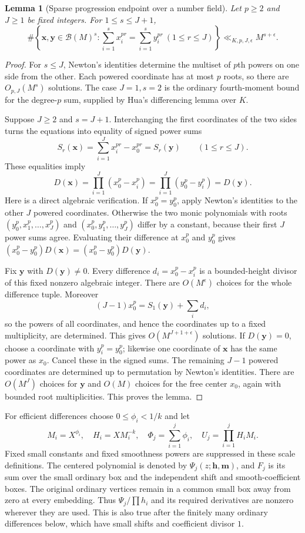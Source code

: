 \documentclass[11pt,reqno]{amsart}
\numberwithin{equation}{section}
\newtheorem{lemma}[theorem]{Lemma}
\theoremstyle{definition}
\begin{document}
\begin{lemma}[Sparse progression endpoint over a number field]
\label{lem:field-sparse-endpoint}
Let $p\ge2$ and $J\ge1$ be fixed integers. For $1\le s\le J+1$,
\[
 \#\left\{\mathbf x,\mathbf y\in\mathcal B(M)^s:
       \sum_{i=1}^s x_i^{pr}=\sum_{i=1}^s y_i^{pr}\ (1\le r\le J)\right\}
 \ll_{K,p,J,\epsilon} M^{s+\epsilon}.
\]
\end{lemma}
\begin{proof}
For $s\le J$, Newton's identities determine the multiset of $p$th powers
on one side from the other. Each powered coordinate has at most $p$ roots,
so there are $O_{p,J}(M^s)$ solutions. The case $J=1,s=2$ is the ordinary
fourth-moment bound for the degree-$p$ sum, supplied by Hua's differencing
lemma over $K$.

Suppose $J\ge2$ and $s=J+1$. Interchanging the first coordinates of the two
sides turns the equations into equality of signed power sums
\[
 S_r(\mathbf x)=\sum_{i=1}^J x_i^{pr}-x_0^{pr}
             =S_r(\mathbf y)\qquad(1\le r\le J).
\]
These equalities imply
\[
 D(\mathbf x)=\prod_{i=1}^J(x_0^p-x_i^p)
             =\prod_{i=1}^J(y_0^p-y_i^p)=D(\mathbf y).
\]
Here is a direct algebraic verification. If $x_0^p=y_0^p$, apply Newton's
identities to the other $J$ powered coordinates. Otherwise the two monic
polynomials with roots $(y_0^p,x_1^p,\ldots,x_J^p)$ and
$(x_0^p,y_1^p,\ldots,y_J^p)$ differ by a constant, because their first $J$
power sums agree. Evaluating their difference at $x_0^p$ and $y_0^p$ gives
$(x_0^p-y_0^p)D(\mathbf x)=(x_0^p-y_0^p)D(\mathbf y)$.

Fix $\mathbf y$ with $D(\mathbf y)\ne0$. Every difference
$d_i=x_0^p-x_i^p$ is a bounded-height divisor of this fixed nonzero algebraic
integer. There are $O(M^\epsilon)$ choices for the whole difference tuple.
Moreover
\[
 (J-1)x_0^p=S_1(\mathbf y)+\sum_i d_i,
\]
so the powers of all coordinates, and hence the coordinates up to a fixed
multiplicity, are determined. This gives $O(M^{J+1+\epsilon})$ solutions.
If $D(\mathbf y)=0$, choose a coordinate with $y_i^p=y_0^p$; likewise one
coordinate of $\mathbf x$ has the same power as $x_0$.
Cancel these in the signed sums. The remaining $J-1$ powered coordinates
are determined up to permutation by Newton's identities. There are
$O(M^J)$ choices for $\mathbf y$ and $O(M)$ choices for the free center
$x_0$, again with bounded root multiplicities. This proves the lemma.
\end{proof}

For efficient differences choose $0\le\phi_i<1/k$ and let
\[
 M_i=X^{\phi_i},\quad H_i=X M_i^{-k},\quad
 \Phi_j=\sum_{i=1}^j\phi_i,\quad
 U_j=\prod_{i=1}^jH_iM_i.
\]
Fixed small constants and fixed smoothness powers are suppressed in these
scale definitions. The centered polynomial is denoted by $\Psi_j(z;\mathbf
h,\mathbf m)$, and $F_j$ is its sum over the small ordinary box and the
independent shift and smooth-coefficient boxes. The original ordinary
vertices remain in a common small box away from zero at every embedding.
Thus $\Psi_j/\prod h_i$ and its required derivatives are nonzero wherever
they are used. This is also true after the finitely many ordinary differences
below, which have small shifts and coefficient divisor $1$.
\end{document}

